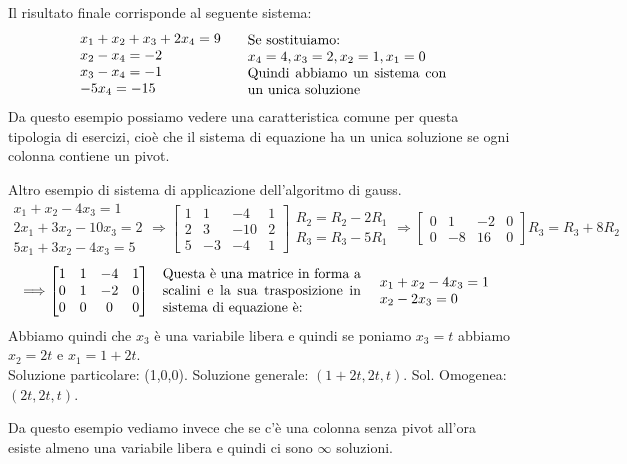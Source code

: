 Il risultato finale corrisponde al seguente sistema:
\[
\begin{array}{l}
x_1 + x_2 + x_3 + 2x_4 = 9\\
x_2 - x_4 = -2\\
x_3 - x_4 = -1\\
-5x_4 = -15
\end{array}
\hspace{.5cm}
\parbox{5cm}{Se sostituiamo: \\$x_4 = 4, x_3 = 2, x_2 = 1, x_1 = 0$\\Quindi abbiamo un sistema con un unica soluzione}
\]
Da questo esempio possiamo vedere una caratteristica comune per questa tipologia di esercizi, cioè che il sistema di equazione ha un unica soluzione se ogni colonna contiene un pivot.

\newpage
\begin{example}
Altro esempio di sistema di applicazione dell'algoritmo di gauss.
\[
    \begin{array}{l}
    x_1 + x_2 - 4x_3 = 1\\
    2x_1 + 3x_2 - 10x_3 = 2\\
    5x_1 + 3x_2 - 4x_3 = 5
    \end{array}
    \Longrightarrow
    \begin{bmatrix}
    1 & 1 & -4 & 1\\
    2 & 3 & -10 & 2\\
    5 & -3 & -4 & 1
    \end{bmatrix}
    \begin{array}{r}
    R_2 = R_2 - 2R_1\\
    R_3 = R_3 - 5R_1
    \end{array}
    \Longrightarrow
    \begin{bmatrix}
    0 & 1 & -2 & 0\\
    0 & -8 & 16 & 0
    \end{bmatrix}
    R_3 = R_3 + 8R_2
\]
\[
    \Longrightarrow
    \begin{bmatrix}
    1 & 1 & -4 & 1\\
    0 & 1 & -2 & 0\\
    0 & 0 & 0 & 0
    \end{bmatrix}
    \hspace{.3cm}
    \parbox{5cm}{Questa è una matrice in forma a scalini e la sua trasposizione in sistema di equazione è:}
    \hspace{.3cm}
    \begin{array}{l}
    x_1 + x_2 - 4x_3 = 1\\
    x_2 - 2x_3 = 0
    \end{array}
\]
Abbiamo quindi che $x_3$ è una variabile libera e quindi se poniamo $x_3 = t$ abbiamo $x_2 = 2t$ e $x_1 = 1+2t$.\\
Soluzione particolare: (1,0,0). Soluzione generale: $(1+2t, 2t, t)$. Sol. Omogenea: $(2t, 2t, t)$.
\end{example}
\hspace{-15pt}Da questo esempio vediamo invece che se c'è una colonna senza pivot all'ora esiste almeno una variabile libera e quindi ci sono $\infty$ soluzioni.

